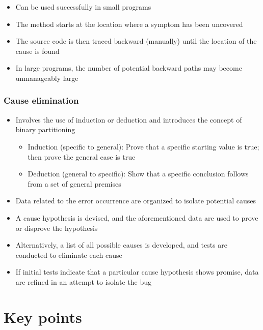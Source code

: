 \documentclass{article}
\begin{document}
\begin{itemize}
  \item Can be used successfully in small programs 
  \item The method starts at the location where a symptom has been uncovered 
  \item The source code is then traced backward (manually) until the location of the cause is found 
  \item In large programs, the number of potential backward paths may become unmanageably large
\end{itemize}

\subsubsection{Cause elimination}

\begin{itemize}
  \item Involves the use of induction or deduction and introduces the concept of binary partitioning
  \begin{itemize}
    \item Induction (specific to general): Prove that a specific starting value is true; then prove the general case is true
    \item Deduction (general to specific): Show that a specific conclusion follows from a set of general premises 
  \end{itemize}
  \item Data related to the error occurrence are organized to isolate potential causes 
  \item A cause hypothesis is devised, and the aforementioned data are used to prove or disprove the hypothesis 
  \item Alternatively, a list of all possible causes is developed, and tests are conducted to eliminate each cause 
  \item If initial tests indicate that a particular cause hypothesis shows promise, data are refined in an attempt to isolate the bug
\end{itemize}

\section{Key points}
\end{document}
